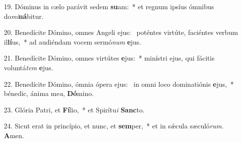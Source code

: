 19. Dóminus in cælo parávit sedem \textbf{su}am:~*  et regnum ipsíus ómnibus do\textit{mi}\textbf{ná}bitur.\

20. Benedícite Dómino, omnes Angeli ejus: \dag\  poténtes virtúte, faciéntes verbum il\textbf{lí}us,~*  ad audiéndam vocem sermó\textit{num} \textbf{e}jus.\

21. Benedícite Dómino, omnes virtútes \textbf{e}jus:~*  minístri ejus, qui fácitis voluntá\textit{tem} \textbf{e}jus.\

22. Benedícite Dómino, ómnia ópera ejus: \dag\  in omni loco dominatiónis \textbf{e}jus,~*  bénedic, ánima me\textit{a}, \textbf{Dó}mino.\

23. Glória Patri, et \textbf{Fí}lio,~*  et Spirítu\textit{i} \textbf{Sanc}to.\

24. Sicut erat in princípio, et nunc, et \textbf{sem}per,~*  et in sǽcula sæculó\textit{rum}. \textbf{A}men.\

